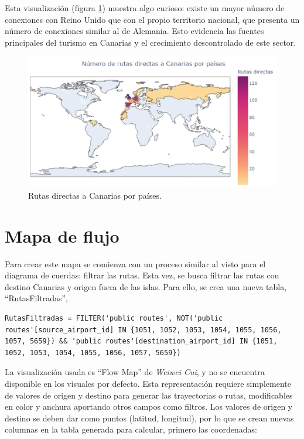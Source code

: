 \documentclass[11pt]{opticajnl}
\begin{document}
Esta visualización (figura \ref{fig:coro}) muestra algo curioso: existe un mayor número de conexiones con Reino Unido que con el propio territorio nacional, que presenta un número de conexiones similar al de Alemania. Esto evidencia las fuentes principales del turismo en Canarias y el crecimiento descontrolado de este sector.

\begin{figure}[h]
\centering
\includegraphics[width=\textwidth]{fotos/coro.png}
\caption{Rutas directas a Canarias por países.}
\label{fig:coro}
\end{figure}

\section{Mapa de flujo}

Para crear este mapa se comienza con un proceso similar al visto para el diagrama de cuerdas: filtrar las rutas. Esta vez, se busca filtrar las rutas con destino Canarias y origen fuera de las islas. Para ello, se crea una nueva tabla, ``RutasFiltradas'',

\begin{lstlisting}[style=terminal]
RutasFiltradas = FILTER('public routes', NOT('public routes'[source_airport_id] IN {1051, 1052, 1053, 1054, 1055, 1056, 1057, 5659}) && 'public routes'[destination_airport_id] IN {1051, 1052, 1053, 1054, 1055, 1056, 1057, 5659})
\end{lstlisting}

La visualización usada es ``Flow Map'' de \textit{Weiwei Cui}, y no se encuentra disponible en los visuales por defecto. Esta representación requiere simplemente de valores de origen y destino para generar las trayectorias o rutas, modificables en color y anchura aportando otros campos como filtros. Los valores de origen y destino se deben dar como puntos (latitud, longitud), por lo que se crean nuevas columnas en la tabla generada para calcular, primero las coordenadas:
\end{document}
